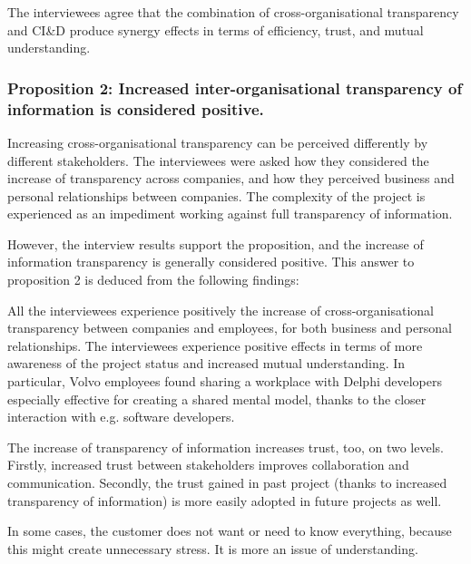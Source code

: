  The interviewees agree that the combination of cross-organisational transparency and CI\&D produce synergy effects in terms of efficiency, trust, and mutual understanding.

\subsubsection{Proposition 2: Increased inter-organisational transparency of information is considered positive.}

Increasing cross-organisational transparency can be perceived differently by different stakeholders. The interviewees were asked how they considered the increase of transparency across companies, and how they perceived business and personal relationships between companies. The complexity of the project is experienced as an impediment working against full transparency of information.

However, the interview results support the proposition, and the increase of information transparency is generally considered positive. This answer to proposition 2 is deduced from the following findings:

 All the interviewees experience positively the increase of cross-organisational transparency between companies and employees, for both business and personal relationships. The interviewees experience positive effects in terms of more awareness of the project status and increased mutual understanding. In particular, Volvo employees found sharing a workplace with Delphi developers especially effective for creating a shared mental model, thanks to the closer interaction with e.g. software developers.

 The increase of transparency of information increases trust, too, on two levels. Firstly, increased trust between stakeholders improves collaboration and communication. Secondly, the trust gained in past project (thanks to increased transparency of information) is more easily adopted in future projects as well. 

 In some cases, the customer does not want or need to know everything, because this might create unnecessary stress. It is more an issue of understanding. 

